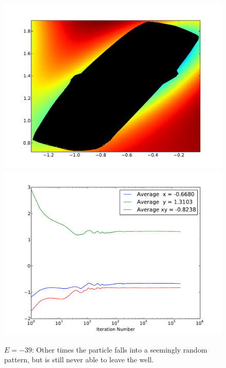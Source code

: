 \documentclass[letterpaper]{article}
\begin{document}
\begin{figure}[p]
\begin{center}
\includegraphics[width=5in]{t7.pdf}
\includegraphics[width=5in]{t7a.pdf}
\end{center}
\caption{$E=-39$: Other times the particle falls into a seemingly random
pattern, but is still never able to leave the well.}
\label{fig:t7}
\end{figure}
\end{document}
